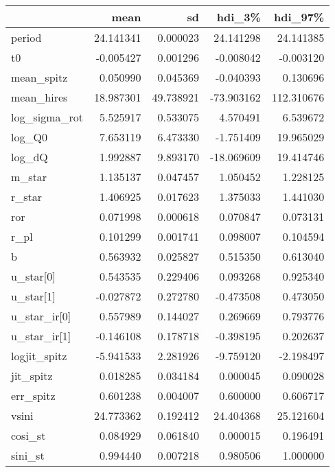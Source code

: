 \begin{tabular}{lrrrr}
\toprule
{} &       mean &         sd &     hdi\_3\% &     hdi\_97\% \\
\midrule
period        &  24.141341 &   0.000023 &  24.141298 &   24.141385 \\
t0            &  -0.005427 &   0.001296 &  -0.008042 &   -0.003120 \\
mean\_spitz    &   0.050990 &   0.045369 &  -0.040393 &    0.130696 \\
mean\_hires    &  18.987301 &  49.738921 & -73.903162 &  112.310676 \\
log\_sigma\_rot &   5.525917 &   0.533075 &   4.570491 &    6.539672 \\
log\_Q0        &   7.653119 &   6.473330 &  -1.751409 &   19.965029 \\
log\_dQ        &   1.992887 &   9.893170 & -18.069609 &   19.414746 \\
m\_star        &   1.135137 &   0.047457 &   1.050452 &    1.228125 \\
r\_star        &   1.406925 &   0.017623 &   1.375033 &    1.441030 \\
ror           &   0.071998 &   0.000618 &   0.070847 &    0.073131 \\
r\_pl          &   0.101299 &   0.001741 &   0.098007 &    0.104594 \\
b             &   0.563932 &   0.025827 &   0.515350 &    0.613040 \\
u\_star[0]     &   0.543535 &   0.229406 &   0.093268 &    0.925340 \\
u\_star[1]     &  -0.027872 &   0.272780 &  -0.473508 &    0.473050 \\
u\_star\_ir[0]  &   0.557989 &   0.144027 &   0.269669 &    0.793776 \\
u\_star\_ir[1]  &  -0.146108 &   0.178718 &  -0.398195 &    0.202637 \\
logjit\_spitz  &  -5.941533 &   2.281926 &  -9.759120 &   -2.198497 \\
jit\_spitz     &   0.018285 &   0.034184 &   0.000045 &    0.090028 \\
err\_spitz     &   0.601238 &   0.004007 &   0.600000 &    0.606717 \\
vsini         &  24.773362 &   0.192412 &  24.404368 &   25.121604 \\
cosi\_st       &   0.084929 &   0.061840 &   0.000015 &    0.196491 \\
sini\_st       &   0.994440 &   0.007218 &   0.980506 &    1.000000 \\

\end{tabular}
